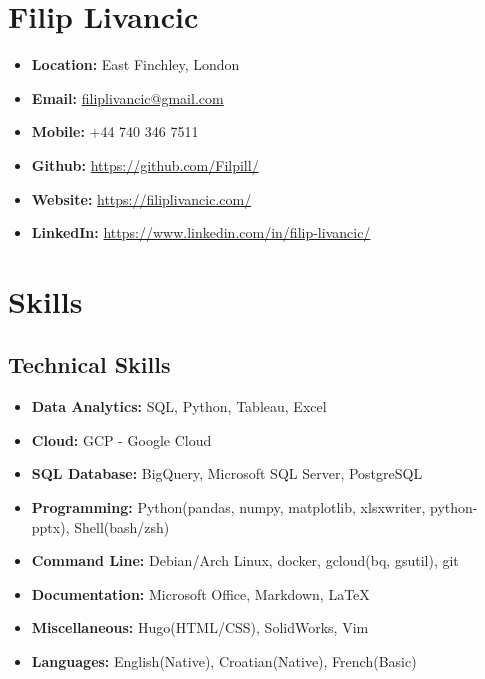 \documentclass[a4paper,9pt]{article}
\date{}
\begin{document}
\section*{Filip Livancic}

\begin{itemize}[noitemsep]
    \item\textbf{Location: }East Finchley, London
    \item\textbf{Email: }\href{mailto:filiplivancic@gmail.com}{filiplivancic@gmail.com}
    \item\textbf{Mobile: }+44 740 346 7511
    \item\textbf{Github: }\url{https://github.com/Filpill/}
    \item\textbf{Website: }\url{https://filiplivancic.com/}
    \item\textbf{LinkedIn: }\url{https://www.linkedin.com/in/filip-livancic/}
\end{itemize}


\section*{Skills}
\subsection*{Technical Skills}
\begin{itemize}[noitemsep]
	\item \textbf{Data Analytics:} \hspace{1mm}  SQL, Python, Tableau, Excel
    \item \textbf{Cloud:} \hspace{17mm} GCP - Google Cloud
	\item \textbf{SQL Database:} \hspace{2.5mm} BigQuery, Microsoft SQL Server, PostgreSQL
    \item \textbf{Programming:} \hspace{3.3mm} Python(pandas, numpy, matplotlib, xlsxwriter, python-pptx), Shell(bash/zsh)
	\item \textbf{Command Line:} \hspace{0.5mm} Debian/Arch Linux, docker, gcloud(bq, gsutil), git
    \item \textbf{Documentation:} \hspace{0.5mm} Microsoft Office, Markdown, LaTeX
    \item \textbf{Miscellaneous:} \hspace{3.3mm} Hugo(HTML/CSS), SolidWorks, Vim
	\item \textbf{Languages:} \hspace{9.3mm} English(Native), Croatian(Native), French(Basic)
\end{itemize}
\end{document}
